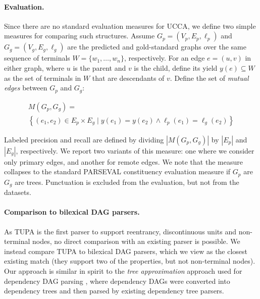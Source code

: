 \documentclass[11pt,a4paper]{article}
\newcommand{\parser}[1]{TUPA\textsubscript{#1}}
\begin{document}
\paragraph{Evaluation.}
Since there are no standard evaluation measures for UCCA, we define
two simple measures for comparing such structures.
Assume $G_p=(V_p,E_p,\ell_p)$ and $G_g=(V_g,E_g,\ell_g)$
are the predicted and gold-standard graphs over the same
sequence of terminals $W = \{w_1,\ldots,w_n\}$, respectively.
For an edge $e=(u,v)$ in either graph,
where $u$ is the parent and $v$ is the child, define its yield $y(e) \subseteq W$ as the
set of terminals in $W$ that are descendants of $v$.
Define the set of \textit{mutual edges} between $G_p$ and $G_g$:

\vspace{-.6cm}

{\small
\begin{multline*}
    M(G_p,G_g) = \\
    \left\{(e_1,e_2) \in E_p \times E_g \;|\;
    y(e_1) = y(e_2) \wedge \ell_p(e_1)=\ell_g(e_2)\right\}
\end{multline*}
}

\vspace{-.6cm}

Labeled precision and recall are defined by dividing $|M(G_p,G_g)|$ by $|E_p|$ and $|E_g|$, respectively.
We report two variants of this measure: one where we consider only primary edges,
and another for remote edges. We note that the measure collapses to the standard
PARSEVAL constituency evaluation measure if $G_p$ are $G_g$ are trees.
Punctuation is excluded from the evaluation, but not from the datasets.

\paragraph{Comparison to bilexical DAG parsers.}
As \parser{} is the first parser to support reentrancy, discontinuous units and
non-terminal nodes, no direct comparison with an existing parser is possible.
We instead compare \parser{} to bilexical DAG parsers,
which we view as the closest existing match (they support two of the properties,
but not non-terminal nodes).
Our approach is similar in spirit
to the \textit{tree approximation} approach used for dependency DAG parsing
\cite{agic2015semantic,fernandez2015parsing},
where dependency DAGs were converted into dependency trees
and then parsed by existing dependency tree parsers.
\end{document}
